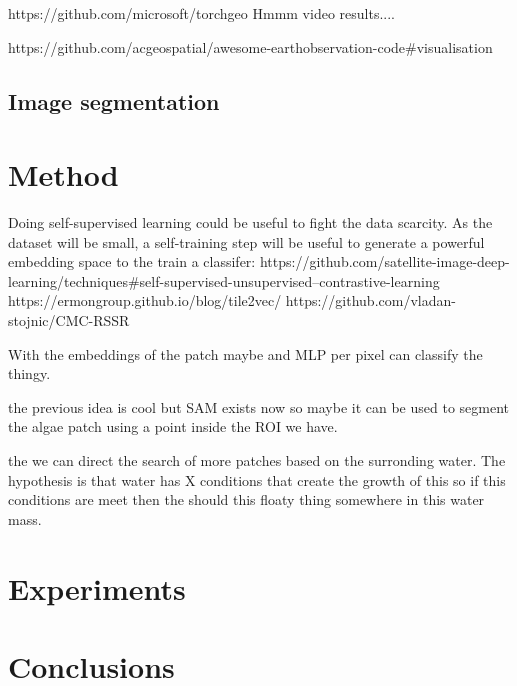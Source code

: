 \documentclass[notitlepage]{report}
\begin{document}
    https://github.com/microsoft/torchgeo
    \newline
    Hmmm video results....

    https://github.com/acgeospatial/awesome-earthobservation-code#visualisation

    \subsection*{Image segmentation}


    \section*{Method}

    Doing self-supervised learning could be useful to fight the data scarcity.
    As the dataset will be small, a self-training step will be useful to generate
    a powerful embedding space to the train a classifer:
    https://github.com/satellite-image-deep-learning/techniques#self-supervised-unsupervised--contrastive-learning
    https://ermongroup.github.io/blog/tile2vec/
    https://github.com/vladan-stojnic/CMC-RSSR
    
    With the embeddings of the patch maybe and MLP per pixel can classify the thingy.
    
    
    the previous idea is cool but SAM exists now so maybe it can be used to segment the algae patch
    using a point inside the ROI we have.
    
    the we can direct the search of more patches based on the surronding water. 
    The hypothesis is that water has X conditions that create the growth of this so if this conditions
    are meet then the should this floaty thing somewhere in this water mass.


    \section*{Experiments}


    \section*{Conclusions}
\end{document}
